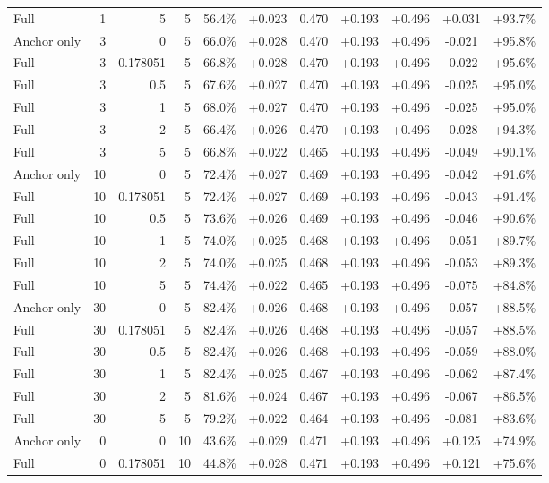\begin{table}[htbp]
\begin{tabular}{lrrrccccccc}
Full & 1 & 5 & 5 & 56.4\% & +0.023 & 0.470 & +0.193 & +0.496 & +0.031 & +93.7\% \\
Anchor only & 3 & 0 & 5 & 66.0\% & +0.028 & 0.470 & +0.193 & +0.496 & -0.021 & +95.8\% \\
Full & 3 & 0.178051 & 5 & 66.8\% & +0.028 & 0.470 & +0.193 & +0.496 & -0.022 & +95.6\% \\
Full & 3 & 0.5 & 5 & 67.6\% & +0.027 & 0.470 & +0.193 & +0.496 & -0.025 & +95.0\% \\
Full & 3 & 1 & 5 & 68.0\% & +0.027 & 0.470 & +0.193 & +0.496 & -0.025 & +95.0\% \\
Full & 3 & 2 & 5 & 66.4\% & +0.026 & 0.470 & +0.193 & +0.496 & -0.028 & +94.3\% \\
Full & 3 & 5 & 5 & 66.8\% & +0.022 & 0.465 & +0.193 & +0.496 & -0.049 & +90.1\% \\
Anchor only & 10 & 0 & 5 & 72.4\% & +0.027 & 0.469 & +0.193 & +0.496 & -0.042 & +91.6\% \\
Full & 10 & 0.178051 & 5 & 72.4\% & +0.027 & 0.469 & +0.193 & +0.496 & -0.043 & +91.4\% \\
Full & 10 & 0.5 & 5 & 73.6\% & +0.026 & 0.469 & +0.193 & +0.496 & -0.046 & +90.6\% \\
Full & 10 & 1 & 5 & 74.0\% & +0.025 & 0.468 & +0.193 & +0.496 & -0.051 & +89.7\% \\
Full & 10 & 2 & 5 & 74.0\% & +0.025 & 0.468 & +0.193 & +0.496 & -0.053 & +89.3\% \\
Full & 10 & 5 & 5 & 74.4\% & +0.022 & 0.465 & +0.193 & +0.496 & -0.075 & +84.8\% \\
Anchor only & 30 & 0 & 5 & 82.4\% & +0.026 & 0.468 & +0.193 & +0.496 & -0.057 & +88.5\% \\
Full & 30 & 0.178051 & 5 & 82.4\% & +0.026 & 0.468 & +0.193 & +0.496 & -0.057 & +88.5\% \\
Full & 30 & 0.5 & 5 & 82.4\% & +0.026 & 0.468 & +0.193 & +0.496 & -0.059 & +88.0\% \\
Full & 30 & 1 & 5 & 82.4\% & +0.025 & 0.467 & +0.193 & +0.496 & -0.062 & +87.4\% \\
Full & 30 & 2 & 5 & 81.6\% & +0.024 & 0.467 & +0.193 & +0.496 & -0.067 & +86.5\% \\
Full & 30 & 5 & 5 & 79.2\% & +0.022 & 0.464 & +0.193 & +0.496 & -0.081 & +83.6\% \\
Anchor only & 0 & 0 & 10 & 43.6\% & +0.029 & 0.471 & +0.193 & +0.496 & +0.125 & +74.9\% \\
Full & 0 & 0.178051 & 10 & 44.8\% & +0.028 & 0.471 & +0.193 & +0.496 & +0.121 & +75.6\% \\

\end{tabular}
\end{table}
